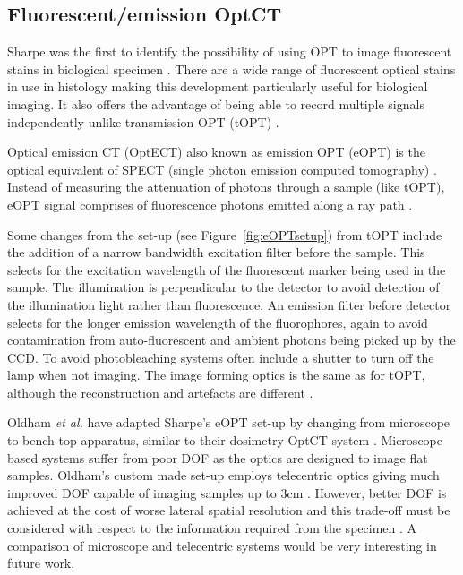 \documentclass[12pt]{article}
\begin{document}
\subsection{Fluorescent/emission  OptCT}
\label{subsec:eOPT}

Sharpe was the first to identify the possibility of using OPT to image fluorescent stains in biological specimen \cite{Sharpe:2002jp}. There are a wide range of fluorescent optical stains in use in histology making this development particularly useful for biological imaging. It also offers the advantage of being able to record multiple signals independently unlike  transmission OPT (tOPT) \cite{Sharpe:2002jp}. 


Optical emission CT (OptECT) also known as emission OPT (eOPT) is the optical equivalent of SPECT (single photon emission computed tomography) \cite{Oldham:2007ku}.  Instead of measuring the attenuation of photons through a sample (like tOPT), eOPT signal comprises of fluorescence photons emitted along a ray path \cite{Walls:2005ja}.



Some changes from the set-up (see Figure~\ref{fig:eOPTsetup}) from tOPT  include the addition of a narrow bandwidth excitation filter before the sample. This selects for the excitation wavelength of the fluorescent marker being used in the sample. The illumination is perpendicular to the detector to avoid detection of the illumination light rather than fluorescence. An emission filter before detector selects for the longer emission wavelength of the fluorophores, again to avoid contamination from auto-fluorescent and ambient photons being picked up by the CCD. To avoid photobleaching systems often include a shutter to turn off the lamp when not imaging.  The image forming optics is the same as for tOPT, although the reconstruction and artefacts are different \cite{Walls:2005ja}.



Oldham \textit{et al.} have adapted Sharpe's eOPT set-up by changing from microscope to bench-top apparatus, similar to their dosimetry OptCT system \cite{Oldham:2006, Oldham:2007ku}. Microscope based systems suffer from poor DOF as the optics are designed to image flat samples.  Oldham's custom made set-up employs telecentric optics giving much improved DOF capable of imaging samples up to 3cm \cite{Oldham:2007ku}. However, better DOF is achieved at the cost of worse lateral spatial resolution and this trade-off must be considered with respect to the information required from the specimen \cite{Krstajic:2006kna}.   A comparison of microscope and telecentric systems would be very interesting in future work.
\end{document}
